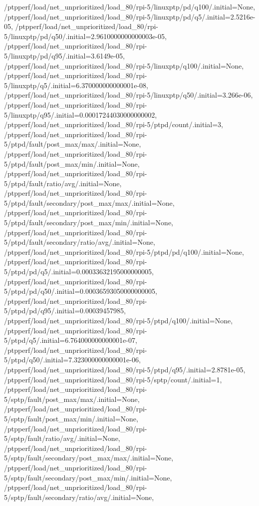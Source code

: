 {    /ptpperf/load/net_unprioritized/load_80/rpi-5/linuxptp/pd/q100/.initial=None,
    /ptpperf/load/net_unprioritized/load_80/rpi-5/linuxptp/pd/q5/.initial=2.5216e-05,
    /ptpperf/load/net_unprioritized/load_80/rpi-5/linuxptp/pd/q50/.initial=2.9610000000000003e-05,
    /ptpperf/load/net_unprioritized/load_80/rpi-5/linuxptp/pd/q95/.initial=3.6149e-05,
    /ptpperf/load/net_unprioritized/load_80/rpi-5/linuxptp/q100/.initial=None,
    /ptpperf/load/net_unprioritized/load_80/rpi-5/linuxptp/q5/.initial=6.370000000000001e-08,
    /ptpperf/load/net_unprioritized/load_80/rpi-5/linuxptp/q50/.initial=3.266e-06,
    /ptpperf/load/net_unprioritized/load_80/rpi-5/linuxptp/q95/.initial=0.00017244030000000002,
    /ptpperf/load/net_unprioritized/load_80/rpi-5/ptpd/count/.initial=3,
    /ptpperf/load/net_unprioritized/load_80/rpi-5/ptpd/fault/post_max/max/.initial=None,
    /ptpperf/load/net_unprioritized/load_80/rpi-5/ptpd/fault/post_max/min/.initial=None,
    /ptpperf/load/net_unprioritized/load_80/rpi-5/ptpd/fault/ratio/avg/.initial=None,
    /ptpperf/load/net_unprioritized/load_80/rpi-5/ptpd/fault/secondary/post_max/max/.initial=None,
    /ptpperf/load/net_unprioritized/load_80/rpi-5/ptpd/fault/secondary/post_max/min/.initial=None,
    /ptpperf/load/net_unprioritized/load_80/rpi-5/ptpd/fault/secondary/ratio/avg/.initial=None,
    /ptpperf/load/net_unprioritized/load_80/rpi-5/ptpd/pd/q100/.initial=None,
    /ptpperf/load/net_unprioritized/load_80/rpi-5/ptpd/pd/q5/.initial=0.00033632195000000005,
    /ptpperf/load/net_unprioritized/load_80/rpi-5/ptpd/pd/q50/.initial=0.00036593050000000005,
    /ptpperf/load/net_unprioritized/load_80/rpi-5/ptpd/pd/q95/.initial=0.00039457985,
    /ptpperf/load/net_unprioritized/load_80/rpi-5/ptpd/q100/.initial=None,
    /ptpperf/load/net_unprioritized/load_80/rpi-5/ptpd/q5/.initial=6.764000000000001e-07,
    /ptpperf/load/net_unprioritized/load_80/rpi-5/ptpd/q50/.initial=7.323000000000001e-06,
    /ptpperf/load/net_unprioritized/load_80/rpi-5/ptpd/q95/.initial=2.8781e-05,
    /ptpperf/load/net_unprioritized/load_80/rpi-5/sptp/count/.initial=1,
    /ptpperf/load/net_unprioritized/load_80/rpi-5/sptp/fault/post_max/max/.initial=None,
    /ptpperf/load/net_unprioritized/load_80/rpi-5/sptp/fault/post_max/min/.initial=None,
    /ptpperf/load/net_unprioritized/load_80/rpi-5/sptp/fault/ratio/avg/.initial=None,
    /ptpperf/load/net_unprioritized/load_80/rpi-5/sptp/fault/secondary/post_max/max/.initial=None,
    /ptpperf/load/net_unprioritized/load_80/rpi-5/sptp/fault/secondary/post_max/min/.initial=None,
    /ptpperf/load/net_unprioritized/load_80/rpi-5/sptp/fault/secondary/ratio/avg/.initial=None,
}
